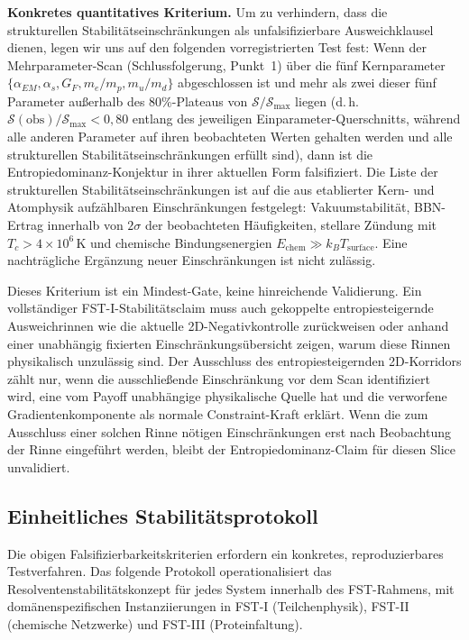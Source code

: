 \documentclass[12pt,a4paper]{article}
\theoremstyle{remark}
\begin{document}
\textbf{Konkretes quantitatives Kriterium.} Um zu verhindern, dass die strukturellen Stabilit\"atseinschr\"ankungen als unfalsifizierbare Ausweichklausel dienen, legen wir uns auf den folgenden vorregistrierten Test fest: Wenn der Mehrparameter-Scan (Schlussfolgerung, Punkt~1) \"uber die f\"unf Kernparameter $\{\alpha_{EM}, \alpha_s, G_F, m_e/m_p, m_u/m_d\}$ abgeschlossen ist und mehr als zwei dieser f\"unf Parameter au\ss{}erhalb des 80\%-Plateaus von $\mathcal{S}/\mathcal{S}_{\max}$ liegen (d.\,h.\ $\mathcal{S}(\text{obs})/\mathcal{S}_{\max} < 0{,}80$ entlang des jeweiligen Einparameter-Querschnitts, w\"ahrend alle anderen Parameter auf ihren beobachteten Werten gehalten werden und alle strukturellen Stabilit\"atseinschr\"ankungen erf\"ullt sind), dann ist die Entropiedominanz-Konjektur in ihrer aktuellen Form falsifiziert. Die Liste der strukturellen Stabilit\"atseinschr\"ankungen ist auf die aus etablierter Kern- und Atomphysik aufz\"ahlbaren Einschr\"ankungen festgelegt: Vakuumstabilit\"at, BBN-Ertrag innerhalb von $2\sigma$ der beobachteten H\"aufigkeiten, stellare Z\"undung mit $T_c > 4 \times 10^6\,\text{K}$ und chemische Bindungsenergien $E_{\text{chem}} \gg k_B T_{\text{surface}}$. Eine nachtr\"agliche Erg\"anzung neuer Einschr\"ankungen ist nicht zul\"assig.

Dieses Kriterium ist ein Mindest-Gate, keine hinreichende Validierung. Ein vollst\"andiger FST-I-Stabilit\"atsclaim muss auch gekoppelte entropiesteigernde Ausweichrinnen wie die aktuelle 2D-Negativkontrolle zur\"uckweisen oder anhand einer unabh\"angig fixierten Einschr\"ankungs\"ubersicht zeigen, warum diese Rinnen physikalisch unzul\"assig sind. Der Ausschluss des entropiesteigernden 2D-Korridors z\"ahlt nur, wenn die ausschlie\ss{}ende Einschr\"ankung vor dem Scan identifiziert wird, eine vom Payoff unabh\"angige physikalische Quelle hat und die verworfene Gradientenkomponente als normale Constraint-Kraft erkl\"art. Wenn die zum Ausschluss einer solchen Rinne n\"otigen Einschr\"ankungen erst nach Beobachtung der Rinne eingef\"uhrt werden, bleibt der Entropiedominanz-Claim f\"ur diesen Slice unvalidiert.

\subsection{Einheitliches Stabilit\"atsprotokoll}\label{sec:stability-protocol}

Die obigen Falsifizierbarkeitskriterien erfordern ein konkretes, reproduzierbares
Testverfahren. Das folgende Protokoll operationalisiert das
Resolventenstabilit\"atskonzept f\"ur jedes System innerhalb des
FST-Rahmens, mit dom\"anenspezifischen Instanziierungen in FST-I
(Teilchenphysik), FST-II (chemische Netzwerke) und FST-III
(Proteinfaltung).
\end{document}
